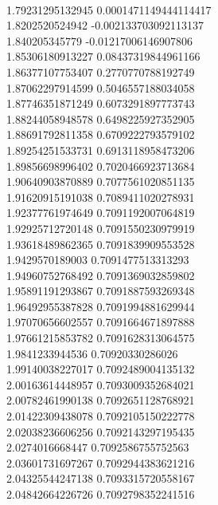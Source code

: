 { \\
1.79231295132945 0.0001471149444114417
 \\
1.8202520524942 -0.002133703092113137
 \\
1.840205345779 -0.01217006146907806
 \\
1.85306180913227 0.08437319844961166
 \\
1.86377107753407 0.2770770788192749
 \\
1.87062297914599 0.5046557188034058
 \\
1.87746351871249 0.6073291897773743
 \\
1.88244058948578 0.6498225927352905
 \\
1.88691792811358 0.6709222793579102
 \\
1.89254251533731 0.6913118958473206
 \\
1.89856698996402 0.7020466923713684
 \\
1.90640903870889 0.7077561020851135
 \\
1.91620915191038 0.7089411020278931
 \\
1.92377761974649 0.7091192007064819
 \\
1.92925712720148 0.7091550230979919
 \\
1.93618489862365 0.7091839909553528
 \\
1.9429570189003 0.7091477513313293
 \\
1.94960752768492 0.7091369032859802
 \\
1.95891191293867 0.7091887593269348
 \\
1.96492955387828 0.7091994881629944
 \\
1.97070656602557 0.7091664671897888
 \\
1.97661215853782 0.7091628313064575
 \\
1.9841233944536 0.70920330286026
 \\
1.99140038227017 0.7092489004135132
 \\
2.00163614448957 0.7093009352684021
 \\
2.00782461990138 0.7092651128768921
 \\
2.01422309438078 0.7092105150222778
 \\
2.02038236606256 0.7092143297195435
 \\
2.0274016668447 0.7092586755752563
 \\
2.03601731697267 0.7092944383621216
 \\
2.04325544247138 0.7093315720558167
 \\
2.04842664226726 0.7092798352241516
 \\
}
